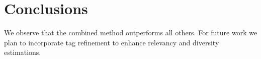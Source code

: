 \documentclass{acm_proc_article-me11_tweaked}
\begin{document}
\section{Conclusions}
We observe that the combined method outperforms all others.
For future work we plan to incorporate tag refinement to enhance relevancy and diversity estimations.

%

\end{document}
